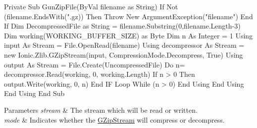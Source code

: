 \begin{DoxyCode}
Private Sub GunZipFile(ByVal filename as String)
    If Not (filename.EndsWith(\textcolor{stringliteral}{".gz)) Then}
\textcolor{stringliteral}{        Throw New ArgumentException("}filename\textcolor{stringliteral}{")}
\textcolor{stringliteral}{    End If}
\textcolor{stringliteral}{    Dim DecompressedFile as String = filename.Substring(0,filename.Length-3)}
\textcolor{stringliteral}{    Dim working(WORKING\_BUFFER\_SIZE) as Byte}
\textcolor{stringliteral}{    Dim n As Integer = 1}
\textcolor{stringliteral}{    Using input As Stream = File.OpenRead(filename)}
\textcolor{stringliteral}{        Using decompressor As Stream = new Ionic.Zlib.GZipStream(input, CompressionMode.Decompress, True)}
\textcolor{stringliteral}{            Using output As Stream = File.Create(UncompressedFile)}
\textcolor{stringliteral}{                Do}
\textcolor{stringliteral}{                    n= decompressor.Read(working, 0, working.Length)}
\textcolor{stringliteral}{                    If n > 0 Then}
\textcolor{stringliteral}{                        output.Write(working, 0, n)}
\textcolor{stringliteral}{                    End IF}
\textcolor{stringliteral}{                Loop While (n  > 0)}
\textcolor{stringliteral}{            End Using}
\textcolor{stringliteral}{        End Using}
\textcolor{stringliteral}{    End Using}
\textcolor{stringliteral}{End Sub}
\end{DoxyCode}
 


\begin{DoxyParams}{Parameters}
{\em stream} & The stream which will be read or written.\\
\hline
{\em mode} & Indicates whether the \mbox{\hyperlink{class_super_tiled2_unity_1_1_ionic_1_1_zlib_1_1_g_zip_stream}{G\+Zip\+Stream}} will compress or decompress.\\
\hline
\end{DoxyParams}
\mbox{\label{class_super_tiled2_unity_1_1_ionic_1_1_zlib_1_1_g_zip_stream_a0c3a1b84d1e634a7405d40ff529330ca}} 
